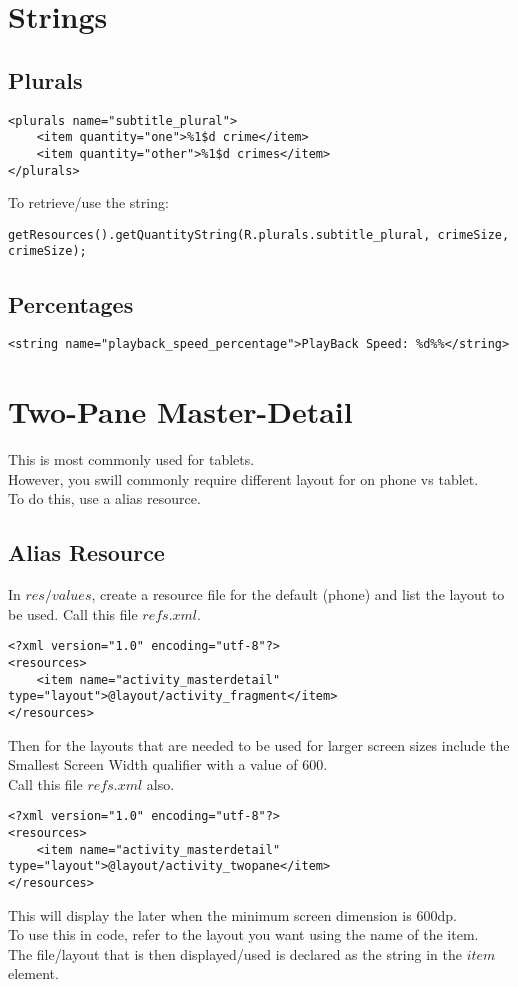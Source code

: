 \documentclass[]{article}
\begin{document}
\section{Strings}
\subsection{Plurals}
\begin{lstlisting}
<plurals name="subtitle_plural">
	<item quantity="one">%1$d crime</item>
	<item quantity="other">%1$d crimes</item>
</plurals>
\end{lstlisting}
To retrieve/use the string:
\begin{lstlisting}
getResources().getQuantityString(R.plurals.subtitle_plural, crimeSize, crimeSize);
\end{lstlisting}

\subsection{Percentages}
\begin{lstlisting}
<string name="playback_speed_percentage">PlayBack Speed: %d%%</string>
\end{lstlisting}

\section{Two-Pane Master-Detail}
This is most commonly used for tablets.  
\\
However, you swill commonly require different layout for on phone vs tablet.
\\
To do this, use a alias resource.
\subsection{Alias Resource}
In $res/values$, create a resource file for the default (phone) and list the layout to be used.  Call this file $refs.xml$.
\begin{lstlisting}
<?xml version="1.0" encoding="utf-8"?>
<resources>
	<item name="activity_masterdetail" type="layout">@layout/activity_fragment</item>
</resources>
\end{lstlisting}
Then for the layouts that are needed to be used for larger screen sizes include the Smallest Screen Width qualifier with a value of 600.
\\
Call this file $refs.xml$ also.
\begin{lstlisting}
<?xml version="1.0" encoding="utf-8"?>
<resources>
	<item name="activity_masterdetail" type="layout">@layout/activity_twopane</item>
</resources>
\end{lstlisting}
This will display the later when the minimum screen dimension is 600dp.
\\
To use this in code, refer to the layout you want using the name of the item.
\\
The file/layout that is then displayed/used is declared as the string in the $item$ element.
\end{document}
